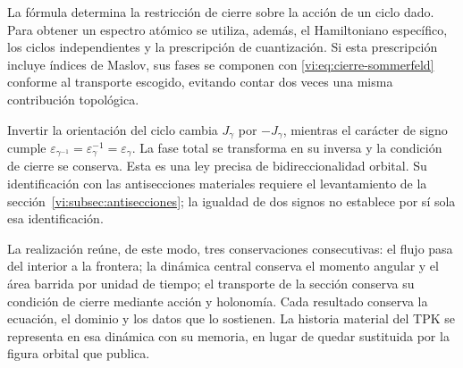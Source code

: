 La fórmula determina la restricción de cierre sobre la
acción de un ciclo dado. Para obtener un espectro atómico
se utiliza, además, el Hamiltoniano específico, los ciclos
independientes y la prescripción de cuantización. Si esta
prescripción incluye índices de Maslov, sus fases se
componen con \eqref{vi:eq:cierre-sommerfeld} conforme al
transporte escogido, evitando contar dos veces una misma
contribución topológica.

Invertir la orientación del ciclo cambia $J_\gamma$ por
$-J_\gamma$, mientras el carácter de signo cumple
$\varepsilon_{\gamma^{-1}}=\varepsilon_\gamma^{-1}
=\varepsilon_\gamma$. La fase total se transforma en su
inversa y la condición de cierre se conserva. Esta es una
ley precisa de bidireccionalidad orbital. Su identificación
con las antisecciones materiales requiere el levantamiento
de la sección~\ref{vi:subsec:antisecciones}; la igualdad
de dos signos no establece por sí sola esa identificación.

La realización reúne, de este modo, tres conservaciones
consecutivas: el flujo pasa del interior a la frontera;
la dinámica central conserva el momento angular y el área
barrida por unidad de tiempo; el transporte de la sección
conserva su condición de cierre mediante acción y
holonomía. Cada resultado conserva la ecuación, el dominio
y los datos que lo sostienen. La historia material del
TPK se representa en esa dinámica con su memoria, en lugar
de quedar sustituida por la figura orbital que publica.
